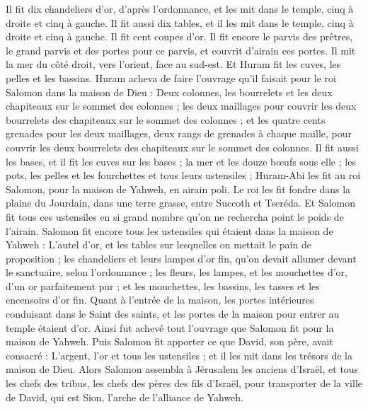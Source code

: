 \begin{multicols}{2}
Il fit dix chandeliers d'or, d'après l'ordonnance, et les mit dans le temple, cinq à droite et cinq à gauche.
Il fit aussi dix tables, et il les mit dans le temple, cinq à droite et cinq à gauche. Il fit cent coupes d'or.
Il fit encore le parvis des prêtres, le grand parvis et des portes pour ce parvis, et couvrit d'airain ces portes.
Il mit la mer du côté droit, vers l'orient, face au sud-est.
Et Huram fit les cuves, les pelles et les bassins. Huram acheva de faire l'ouvrage qu'il faisait pour le roi Salomon dans la maison de Dieu :
Deux colonnes, les bourrelets et les deux chapiteaux sur le sommet des colonnes ; les deux maillages pour couvrir les deux bourrelets des chapiteaux sur le sommet des colonnes ;
et les quatre cents grenades pour les deux maillages, deux rangs de grenades à chaque maille, pour couvrir les deux bourrelets des chapiteaux sur le sommet des colonnes.
Il fit aussi les bases, et il fit les cuves sur les bases ;
la mer et les douze bœufs sous elle ;
les pots, les pelles et les fourchettes et tous leurs ustensiles ; Huram-Abi les fit au roi Salomon, pour la maison de Yahweh, en airain poli.
Le roi les fit fondre dans la plaine du Jourdain, dans une terre grasse, entre Succoth et Tseréda.
Et Salomon fit tous ces ustensiles en si grand nombre qu'on ne rechercha point le poids de l'airain.
Salomon fit encore tous les ustensiles qui étaient dans la maison de Yahweh : L'autel d'or, et les tables sur lesquelles on mettait le pain de proposition ;
les chandeliers et leurs lampes d'or fin, qu'on devait allumer devant le sanctuaire, selon l'ordonnance ;
les fleurs, les lampes, et les mouchettes d'or, d'un or parfaitement pur ;
et les mouchettes, les bassins, les tasses et les encensoirs d'or fin. Quant à l'entrée de la maison, les portes intérieures conduisant dans le Saint des saints, et les portes de la maison pour entrer au temple étaient d'or.
\VerseOne{}Ainsi fut achevé tout l'ouvrage que Salomon fit pour la maison de Yahweh. Puis Salomon fit apporter ce que David, son père, avait consacré : L'argent, l'or et tous les ustensiles ; et il les mit dans les trésors de la maison de Dieu.
Alors Salomon assembla à Jérusalem les anciens d'Israël, et tous les chefs des tribus, les chefs des pères des fils d'Israël, pour transporter de la ville de David, qui est Sion, l'arche de l'alliance de Yahweh.

\end{multicols}
